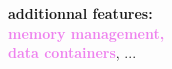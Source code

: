 \begin{frame}
\begin{minipage}{0.26\linewidth}

       {
          \scriptsize
          {\bf additionnal features:}\\
          \textcolor{violet}{\bf memory management,}\\
          \textcolor{violet}{\bf data containers}, ...
       }

  \end{minipage}

\end{frame}

